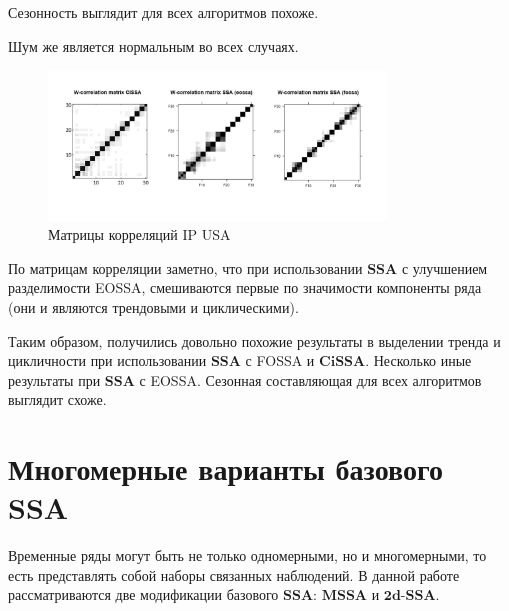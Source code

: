 \documentclass[a4paper, 11pt]{article}
\newcommand{\SSA}{\textbf{SSA}}
\newcommand{\CISSA}{\textbf{CiSSA}}
\newcommand{\MSSA}{\textbf{MSSA}}
\newcommand{\DSSA}{\textbf{2d-SSA}}
\begin{document}
Сезонность выглядит для всех алгоритмов похоже.

Шум же является нормальным во всех случаях.

\begin{figure}[H]
	\centering
	\includegraphics[width=0.8\textwidth]{img/trend inseparability example/W-corr.jpg}
	\caption{Матрицы корреляций IP USA}
	\label{fig:W-corr}
\end{figure}
По матрицам корреляции заметно, что при использовании $\SSA$ с улучшением разделимости EOSSA, смешиваются первые по значимости компоненты ряда (они и являются трендовыми и циклическими).



Таким образом, получились довольно похожие результаты в выделении тренда и цикличности при использовании $\SSA$ с FOSSA и $\CISSA$. Несколько иные результаты при $\SSA$ с EOSSA. Сезонная составляющая для всех алгоритмов выглядит схоже.

\newpage





\section{Многомерные варианты базового SSA}

\label{sec:multidimensional_ssa}

Временные ряды могут быть не только одномерными, но и многомерными, то есть представлять собой наборы связанных наблюдений. В данной работе рассматриваются две модификации базового $\SSA$:
$\MSSA$ и $\DSSA$.
\end{document}

